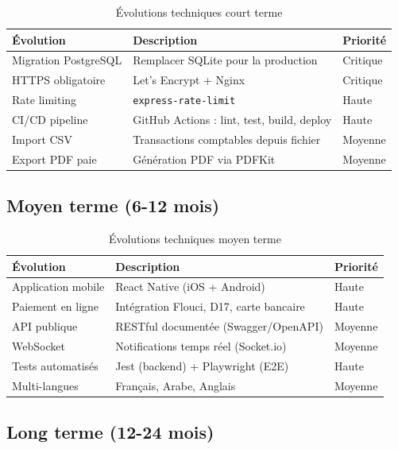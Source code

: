 \begin{table}[H]
\centering
\caption{Évolutions techniques court terme}
\label{tab:evol-court}
\begin{tabular}{|l|l|l|}
\hline
\textbf{Évolution} & \textbf{Description} & \textbf{Priorité} \\
\hline
Migration PostgreSQL & Remplacer SQLite pour la production & Critique \\
\hline
HTTPS obligatoire & Let's Encrypt + Nginx & Critique \\
\hline
Rate limiting & \texttt{express-rate-limit} & Haute \\
\hline
CI/CD pipeline & GitHub Actions : lint, test, build, deploy & Haute \\
\hline
Import CSV & Transactions comptables depuis fichier & Moyenne \\
\hline
Export PDF paie & Génération PDF via PDFKit & Moyenne \\
\hline
\end{tabular}
\end{table}

\subsection{Moyen terme (6-12 mois)}

\begin{table}[H]
\centering
\caption{Évolutions techniques moyen terme}
\label{tab:evol-moyen}
\begin{tabular}{|l|l|l|}
\hline
\textbf{Évolution} & \textbf{Description} & \textbf{Priorité} \\
\hline
Application mobile & React Native (iOS + Android) & Haute \\
\hline
Paiement en ligne & Intégration Flouci, D17, carte bancaire & Haute \\
\hline
API publique & RESTful documentée (Swagger/OpenAPI) & Moyenne \\
\hline
WebSocket & Notifications temps réel (Socket.io) & Moyenne \\
\hline
Tests automatisés & Jest (backend) + Playwright (E2E) & Haute \\
\hline
Multi-langues & Français, Arabe, Anglais & Moyenne \\
\hline
\end{tabular}
\end{table}

\subsection{Long terme (12-24 mois)}

